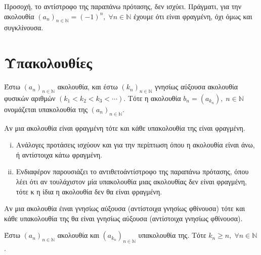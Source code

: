 \documentclass[main.tex]{subfiles}
\begin{document}
\begin{rem}
    Προσοχή, το αντίστροφο της παραπάνω πρότασης, δεν ισχύει. Πράγματι, 
    για την  ακολουθία $ (a_{n})_{n \in \mathbb{N}} = (-1)^{n}, \; 
    \forall n \in \mathbb{N} $ έχουμε ότι είναι φραγμένη, όχι όμως και 
    συγκλίνουσα.
\end{rem}

\section{Υπακολουθίες}

\begin{dfn}
    Έστω $ (a_{n})_{n \in \mathbb{N}} $ ακολουθία, και έστω $ 
    (k_{n})_{n \in \mathbb{N}} $ γνησίως
    αύξουσα ακολουθία φυσικών αριθμών $ (k_{1}<k_{2}<k_{3}<\cdots) $. 
    Τότε η ακολουθία $ b_{n} = (a_{k_{n}}), \; n \in \mathbb{N} $ 
    ονομάζεται \textcolor{Col\thechapter}{υπακολουθία} της 
    $ (a_{n})_{n \in \mathbb{N}} $.
\end{dfn}


\begin{prop}
    Αν μια ακολουθία είναι φραγμένη τότε και κάθε υπακολουθία της 
    είναι φραγμένη.
\end{prop}

\begin{rem}
\item {}
    \begin{enumerate}[i)]
        \item Ανάλογες προτάσεις ισχύουν και για την περίπτωση όπου η 
            ακολουθία είναι άνω, ή αντίστοιχα κάτω φραγμένη.
        \item 
            Ενδιαφέρον παρουσιάζει το αντιθετοάντίστροφο της παραπάνω 
            πρότασης, όπου λέει ότι αν τουλάχιστον μία υπακολουθία μιας 
            ακολουθίας δεν είναι φραγμένη, τότε κ η ίδια η ακολουθία 
            δεν θα είναι φραγμένη.
    \end{enumerate}
\end{rem}

\begin{prop}
    Αν μια ακολουθία έιναι γνησίως αύξουσα (αντίστοιχα γνησίως φθίνουσα) 
    τότε και κάθε υπακολουθία της θα είναι γνησίως αύξουσα (αντίστοιχα 
    γνησίως φθίνουσα).
\end{prop}

\begin{lem}\label{lem:kn}
    Έστω $ (a_{n})_{n \in \mathbb{N}} $ ακολουθία και $ (a_{k_{n}})_
    {n \in \mathbb{N}} $ υπακολουθία της. Τότε $ k_{n} \geq n, \; 
    \forall n \in \mathbb{N} $.
\end{lem}
\end{document}
